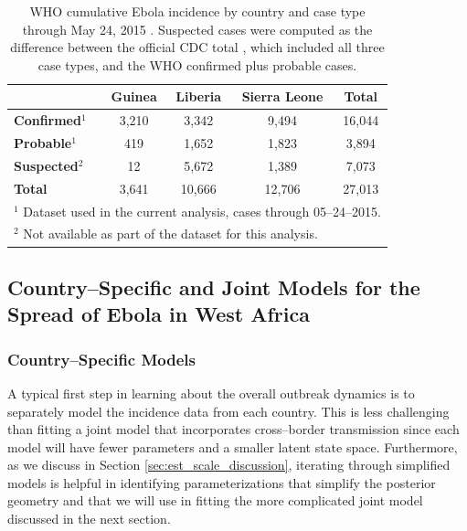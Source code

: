 \begin{table}[htbp]
	\caption[Ebola incidence by country and case type]{WHO cumulative Ebola incidence by country and case type through May 24, 2015 \cite{who2016eboladat}. Suspected cases were computed as the difference between the official CDC total \cite{cdc2016eboladat}, which included all three case types, and the WHO confirmed plus probable cases.}
	\label{tab:ebola_descriptives}
	\small
	\centering
	\begin{tabular}{lcccc}	
		\hline	
		& \textbf{Guinea} & \textbf{Liberia} & \textbf{Sierra Leone} & \textbf{Total} \\\hline
		\textbf{Confirmed}$ ^1 $ & 3,210 & 3,342 & 9,494 & 16,044\\ 
		\textbf{Probable}$ ^1 $ & 419 & 1,652 & 1,823 & 3,894 \\
		\textbf{Suspected$ ^2 $} & 12 & 5,672 & 1,389 & 7,073 \\
		\hline
		\textbf{Total} & 3,641 & 10,666 & 12,706 & 27,013 \\
		\hline
		\multicolumn{5}{l}{\scriptsize $ ^1 $ Dataset used in the current analysis, cases through 05--24--2015.}\\
		\multicolumn{5}{l}{\scriptsize $ ^2 $ Not available as part of the dataset for this analysis.}\\
	\end{tabular} 
\end{table}

\subsection{Country--Specific and Joint Models for the Spread of Ebola in West Africa}
\label{subsec:ebola_models}

\subsubsection{Country--Specific Models}
\label{subsubsec:ebola_single_models}
A typical first step in learning about the overall outbreak dynamics is to separately model the incidence data from each country. This is less challenging than fitting a joint model that incorporates cross--border transmission since each model will have fewer parameters and a smaller latent state space. Furthermore, as we discuss in Section \ref{sec:est_scale_discussion}, iterating through simplified models is helpful in identifying parameterizations that simplify the posterior geometry and that we will use in fitting the more complicated joint model discussed in the next section. 

